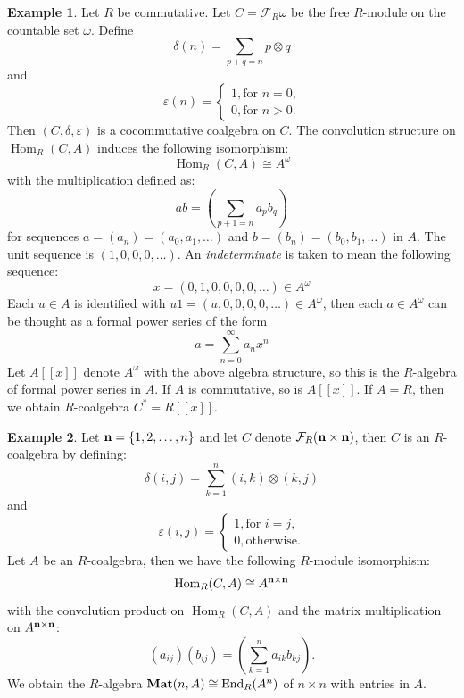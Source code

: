 \documentclass[8pt]{article}
\theoremstyle{definition}
\theoremstyle{definition}
\theoremstyle{definition}
\theoremstyle{definition}
\theoremstyle{definition}
\theoremstyle{definition}
\theoremstyle{definition}
\theoremstyle{definition}
\theoremstyle{definition}
\theoremstyle{definition}
\theoremstyle{definition}
\theoremstyle{definition}
\newtheorem{example}{Example}[section]
\theoremstyle{definition}
\theoremstyle{definition}
\theoremstyle{question}
\begin{document}
\begin{example}
  Let $R$ be commutative. Let $C = \mathcal{F}_R \omega$ be the free $R$-module on the countable set
  $\omega$. Define
  \[
  \delta(n) = \sum \limits_{p + q = n} p \otimes q
  \]
  and
  \[
  \varepsilon(n) = \begin{cases}
    1, \text{for $n = 0$,} \\
    0, \text{for $n > 0$.}
  \end{cases}
  \]
  Then $(C, \delta, \varepsilon)$ is a cocommutative coalgebra on $C$. The convolution structure
  on $\operatorname{Hom}_R(C, A)$ induces the following isomorphism:
  \[
  \operatorname{Hom}_R(C, A) \cong A^{\omega}
  \]
  with the multiplication defined as:
  \[
  a b = \left( \sum \limits_{p + 1 = n} a_p b_q \right)
  \]
  for sequences $a = (a_n) = (a_0, a_1, \ldots)$ and $b = (b_n) = (b_0, b_1, \ldots)$ in $A$.
  The unit sequence is $(1, 0,0,0, \ldots)$. An \emph{indeterminate} is taken to mean the following sequence:
  \[
  x = (0,1,0,0,0,0,\ldots) \in A^{\omega}
  \]
  Each $u \in A$ is identified with $u 1 = (u, 0,0,0,0, \ldots) \in A^{\omega}$, then each $a \in A^{\omega}$
  can be thought as a formal power series of the form
  \[
    a = \sum \limits_{n = 0}^{\infty} a_n x^n
  \]
  Let $A[\![x]\!]$ denote $A^{\omega}$ with the above algebra structure, so this is the $R$-algebra
  of formal power series in $A$. If $A$ is commutative, so is $A[\![x]\!]$. If $A = R$, then we obtain
  $R$-coalgebra $C^* = R[\![x]\!]$.
\end{example}

\begin{example}
  Let ${\bf n} = \{ 1, 2, \ldots, n \}$ and let $C$ denote $\mathcal{F}_R({\bf n} \times {\bf n})$,
  then $C$ is an $R$-coalgebra by defining:
  \[
  \delta(i,j) = \sum \limits_{k = 1}^n(i,k) \otimes (k, j)
  \]
  and
  \[
  \varepsilon(i,j) = \begin{cases}
    1, \text{for $i = j$,} \\
    0, \text{otherwise.}
  \end{cases}
  \]
  Let $A$ be an $R$-coalgebra, then we have the following $R$-module isomorphism:
  \[
  \operatorname{Hom}_R(C, A) \cong A^{{\bf n} \times {\bf n}}
  \]
  with the convolution product on $\operatorname{Hom}_R(C, A)$ and the matrix multiplication on 
  $A^{{\bf n} \times {\bf n}}$:
  \[
  (a_{ij}) (b_{ij}) = \left( \sum \limits_{k = 1}^n a_{ik} b_{kj} \right).
  \]
  We obtain the $R$-algebra ${\bf Mat}(n, A) \cong \operatorname{End}_R(A^n)$
  of $n \times n$ with entries in $A$.
\end{example}
\end{document}
